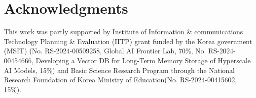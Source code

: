 {\editcolor 
\vspace{-1mm}
\section{Acknowledgments}
\label{sec:ack}
\vspace{-1mm}

This work was partly supported by Institute of Information \& communications Technology Planning \& Evaluation (IITP) grant funded by the Korea government (MSIT) (No. RS-2024-00509258, Global AI Frontier Lab, 70\%, No. RS-2024-00454666, Developing a Vector DB for Long-Term Memory Storage of Hyperscale AI Models, 15\%) and Basic Science Research Program through the National Research Foundation of Korea Ministry of Education(No. RS-2024-00415602, 15\%).
}